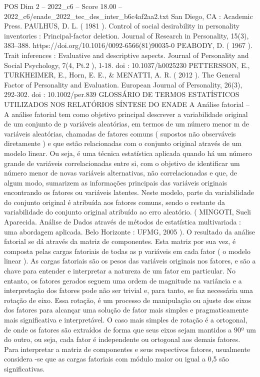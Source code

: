 \begin{textsample}{POS Dim 2 – 2022\_c6 – Score 18.00 – 2022\_c6/enade\_2022\_tec\_des\_inter\_b6c4af2aa2.txt}
San Diego, CA : Academic Press.
PAULHUS, D.
L. ( 1981 ).
Control of social desirability in personality inventories : Principal-factor deletion.
Journal of Research in Personality, 15(3), 383–388. https://doi.org/10.1016/0092-6566(81)90035-0 PEABODY, D. ( 1967 ).
Trait inferences : Evaluative and descriptive aspects.
Journal of Personality and Social Psychology, 7(4, Pt.2 ), 1-18. doi : 10.1037/h0025230 PETTERSSON, E., TURKHEIMER, E., Horn, E.
E., \& MENATTI, A.
R. ( 2012 ).
The General Factor of Personality and Evaluation.
European Journal of Personality, 26(3), 292-302. doi : 10.1002/per.839 GLOSSÁRIO DE TERMOS ESTATÍSTICOS UTILIZADOS NOS RELATÓRIOS SÍNTESE DO ENADE A Análise fatorial – A análise fatorial tem como objetivo principal descrever a variabilidade original de um conjunto de p variáveis aleatórias, em termos de um número menor m de variáveis aleatórias, chamadas de fatores comuns ( supostos não observáveis diretamente ) e que estão relacionadas com o conjunto original através de um modelo linear.
Ou seja, é uma técnica estatística aplicada quando há um número grande de variáveis correlacionadas entre si, com o objetivo de identificar um número menor de novas variáveis alternativas, não correlacionadas e que, de algum modo, sumarizem as informações principais das variáveis originais encontrando os fatores ou variáveis latentes.
Neste modelo, parte da variabilidade do conjunto original é atribuída aos fatores comuns, sendo o restante da variabilidade do conjunto original atribuído ao erro aleatório. ( MINGOTI, Sueli Aparecida.
Análise de Dados através de métodos de estatística multivariada : uma abordagem aplicada.
Belo Horizonte : UFMG, 2005 ).
O resultado da análise fatorial se dá através da matriz de componentes.
Esta matriz por sua vez, é composta pelas cargas fatoriais de todas as p variáveis em cada fator ( o modelo linear ).
As cargas fatoriais são os pesos das variáveis originais nos fatores, e são a chave para entender e interpretar a natureza de um fator em particular.
No entanto, os fatores gerados seguem uma ordem de magnitude na variância e a interpretação dos fatores pode não ser trivial e, para tanto, se faz necessária uma rotação de eixo.
Essa rotação, é um processo de manipulação ou ajuste dos eixos dos fatores para alcançar uma solução de fator mais simples e pragmaticamente mais significativa e interpretável.
O caso mais simples de rotação é a ortogonal, de onde os fatores são extraídos de forma que seus eixos sejam mantidos a 90º um do outro, ou seja, cada fator é independente ou ortogonal aos demais fatores.
Para interpretar a matriz de componentes e seus respectivos fatores, usualmente considera -se que as cargas fatoriais com módulo maior ou igual a 0,5 são significativas.

\end{textsample}
